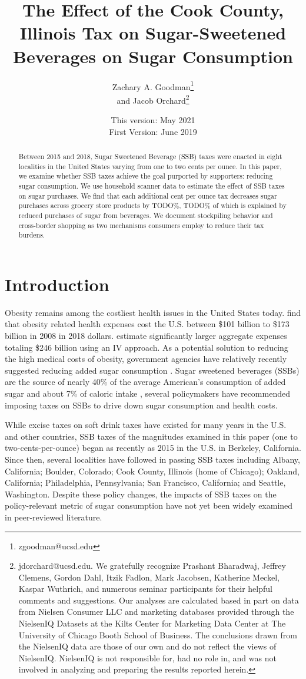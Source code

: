 \documentclass[12pt]{article}
\title{The Effect of the Cook County, Illinois Tax on Sugar-Sweetened Beverages on Sugar Consumption}
\author{Zachary A. Goodman\thanks{zgoodman@ucsd.edu}\\ and Jacob Orchard\thanks{jdorchard@ucsd.edu. We gratefully recognize Prashant Bharadwaj, Jeffrey Clemens, Gordon Dahl, Itzik Fadlon, Mark Jacobsen, Katherine Meckel, Kaspar Wuthrich, and numerous seminar participants for their helpful comments and suggestions. Our analyses are calculated based in part on data from Nielsen Consumer LLC and marketing databases provided through the NielsenIQ Datasets at the Kilts Center for Marketing Data Center at The University of Chicago Booth School of Business. The conclusions drawn from the NielsenIQ data are those of our own and do not reflect the views of NielsenIQ. NielsenIQ is not responsible for, had no role in, and was not involved in analyzing and preparing the results reported herein.}}
\affil{University of California, San Diego}
\date{This version: May 2021\\
First Version: June 2019}
\begin{document}
\maketitle

\begin{abstract}
Between 2015 and 2018, Sugar Sweetened Beverage (SSB) taxes were enacted in eight localities in the United States varying from one to two cents per ounce. In this paper, we examine whether SSB taxes achieve the goal purported by supporters: reducing sugar consumption. We use household scanner data to estimate the effect of SSB taxes on sugar purchases. We find that each additional cent per ounce tax decreases sugar purchases across grocery store products by TODO\%, TODO\% of which is explained by reduced purchases of sugar from beverages. We document stockpiling behavior and cross-border shopping as two mechanisms consumers employ to reduce their tax burdens.
\end{abstract}

\pagebreak

\doublespacing

\section{Introduction} \label{introduction}

Obesity remains among the costliest health issues in the United States today. \textcite{finkelstein2009annual} find that obesity related health expenses cost the U.S. between \$101 billion to \$173 billion in 2008 in 2018 dollars. \textcite{cawley2012medical} estimate significantly larger aggregate expenses totaling \$246 billion using an IV approach.  As a potential solution to reducing the high medical costs of obesity, government agencies have relatively recently suggested reducing added sugar consumption \parencite{dietary2015dietary}. Sugar sweetened beverages (SSBs) are the source of nearly 40\% of the average American's consumption of added sugar \parencite{dietary2015dietary} and about 7\% of caloric intake \parencite{allcott2019should}, several policymakers have recommended imposing taxes on SSBs to drive down sugar consumption and health costs.

While excise taxes on soft drink taxes have existed for many years in the U.S. and other countries, SSB taxes of the magnitudes examined in this paper (one to two-cents-per-ounce) began as recently as 2015 in the U.S. in Berkeley, California. Since then, several localities have followed in passing SSB taxes including Albany, California; Boulder, Colorado; Cook County, Illinois (home of Chicago); Oakland, California; Philadelphia, Pennsylvania; San Francisco, California; and Seattle, Washington. Despite these policy changes, the impacts of SSB taxes on the policy-relevant metric of sugar consumption have not yet been widely examined in peer-reviewed literature.
\end{document}
